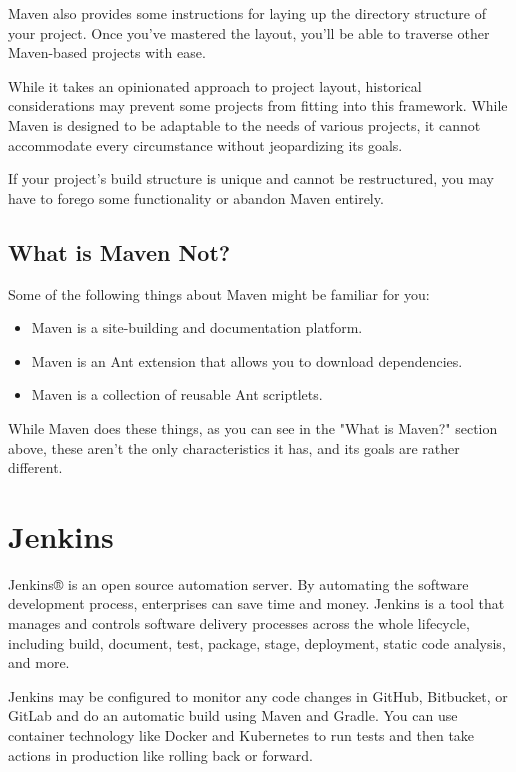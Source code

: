 \tab Maven also provides some instructions for laying up the directory structure of your project. Once you've mastered the layout, you'll be able to traverse other Maven-based projects with ease.

\tab While it takes an opinionated approach to project layout, historical considerations may prevent some projects from fitting into this framework. While Maven is designed to be adaptable to the needs of various projects, it cannot accommodate every circumstance without jeopardizing its goals.

\tab If your project's build structure is unique and cannot be restructured, you may have to forego some functionality or abandon Maven entirely.

\subsection*{What is Maven Not?}
\tab Some of the following things about Maven might be familiar for you:

\begin{itemize}
    \item Maven is a site-building and documentation platform.
    \item Maven is an Ant extension that allows you to download dependencies.
    \item Maven is a collection of reusable Ant scriptlets.
\end{itemize}

\tab While Maven does these things, as you can see in the "What is Maven?" section above, these aren't the only characteristics it has, and its goals are rather different.

\section {Jenkins}
\tab Jenkins® \cite{jenkins_esentials} is an open source automation server. By automating the software development process, enterprises can save time and money. Jenkins is a tool that manages and controls software delivery processes across the whole lifecycle, including build, document, test, package, stage, deployment, static code analysis, and more.

\tab Jenkins may be configured to monitor any code changes in GitHub, Bitbucket, or GitLab and do an automatic build using Maven and Gradle. You can use container technology like Docker and Kubernetes to run tests and then take actions in production like rolling back or forward.

